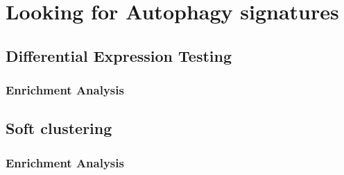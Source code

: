   
    
    

    
    


\section{Looking for Autophagy signatures}

    \subsection{Differential Expression Testing}
    
        \subsubsection{Enrichment Analysis}

    \subsection{Soft clustering}
    
    
        \subsubsection{Enrichment Analysis}
 



